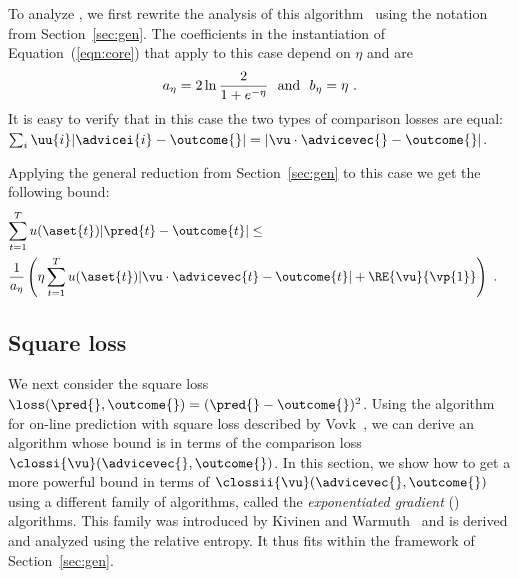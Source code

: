 To analyze \SAbs, we first rewrite
the analysis of this algorithm~\cite{Vovk90,CesabianchiFrHeHaScWa92}
using the notation from Section~\ref{sec:gen}.
The coefficients in the instantiation of Equation~(\ref{eqn:core})
that apply to this case depend on $\eta$ and are 
\begin{equation} \label{eqn:abs-loss-constants}
a_{\eta} = 2 \ln {2 \over 1+e^{-\eta}} ~ \mbox{ and } ~
b_\eta = \eta~.
\end{equation}
It is easy to verify that in this case the two types of comparison
losses are equal:
$\sum_{i} \uu{i} | \advicei{i} - \outcome{} | = 
| \vu\cdot\advicevec{} -\outcome{} |$. 

Applying the general reduction from Section~\ref{sec:gen} 
to this case we get the following bound:
\begin{eqnarray}
\label{e:abs}
\lefteqn{ \sum_{t=1}^T u(\aset{t}) | \pred{t} - \outcome{t} | \leq } \\
 &   {1 \over a_\eta} \left(\displaystyle \eta \sum_{t=1}^T 
  u(\aset{t}) | \vu\cdot\advicevec{t} -\outcome{t} |
 +
        \RE{\vu}{\vp{1}} \right) ~ . \nonumber
\end{eqnarray}
\iffalse
The corollary that parallels Equation~\ref{eqn:SBayes-constant-uAt} is
\begin{equation} \label{eqn:SAbs-constant-uAt}
\sum_{t=1}^T \loss(\pred{t},\outcome{t})
\leq
{1 \over a_\eta}
\left(
\eta
\sum_{t=1}^T 
 \clossiii{\vu}(\advicevec{},\outcome{})
+
{\RE{\vu}{\vp{1}}
 \over 
 U}
\right)
~.
\end{equation}
The interpretation of this bound parallels that of
Equation~\ref{eqn:SBayes-constant-uAt}. 
\fi

\subsection{Square loss}
We next consider the square loss
$\loss(\pred{},\outcome{})=(\pred{} - \outcome{})^2$.
Using the algorithm for on-line prediction with square loss described
by Vovk~\cite{Vovk90}, 
we can derive an algorithm whose bound is in terms of the
comparison loss $\clossi{\vu}(\advicevec{},\outcome{})$.
In this section, we show how to get a more powerful bound in terms of
$\clossii{\vu}(\advicevec{},\outcome{})$ using a
different family of algorithms, called the {\em exponentiated
gradient} (\EG) algorithms. This family was introduced by 
Kivinen and Warmuth~\cite{KivinenWa95} and is
derived and analyzed using the relative
entropy. It thus fits within the
framework of Section~\ref{sec:gen}.

